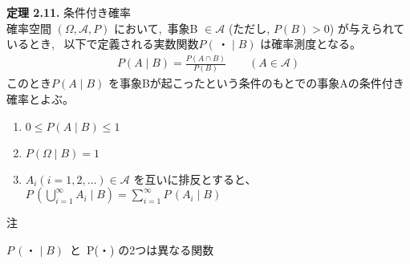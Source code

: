 \documentclass[dvipdfmx,10pt, a4j]{jarticle}
\theoremstyle{definition}
\begin{document}
    \noindent
    \textbf{定理 2.11.} 条件付き確率\\
    確率空間 $(\Omega, \mathcal{A}, P)$ において,\,
    事象B $ \in \mathcal{A}$ (ただし, $P(B) > 0$) が与えられているとき, \, 以下で定義される実数関数$P(\, ・ \mid B)$ は確率測度となる。
    \begin{align*}
        P(A \mid B) = \frac{P(A \cap B)}{P(B)} \qquad (A \in \mathcal{A})
    \end{align*}
    このとき$P(A \mid B)$ を事象Bが起こったという条件のもとでの事象Aの条件付き確率とよぶ。\\
    \begin{enumerate}
        \item $0 \leq P(A \mid B) \leq 1$
        \item $P(\Omega \mid B) = 1$
        \item $A_i (i = 1, 2, \dots) \in \mathcal{A}$ を互いに排反とすると、\\
        $P\, \left(\bigcup_{i=1}^{\infty}{A_i \mid B}\right) = \sum_{i=1}^{\infty}{P\, (A_i \mid B)}$
    \end{enumerate}
    \begin{itembox}[l]{注}
        \begin{flushleft}
            $P\, (・ \mid B)$\, と\, P(・) の2つは異なる関数
        \end{flushleft}
    \end{itembox}\\
\end{document}
